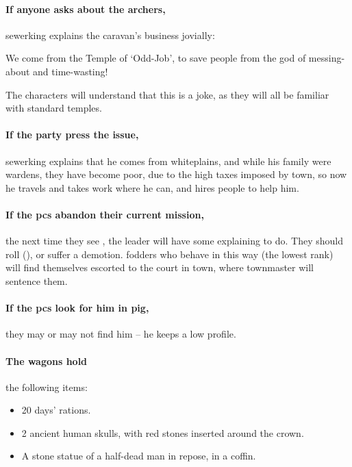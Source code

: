 \setcounter{wounds}{2}
\sewerking


\paragraph{If anyone asks about the archers,}
\gls{sewerking} explains the caravan's business jovially:

\begin{speechtext}
  We come from the Temple of `Odd-Job', to save people from the god of messing-about and time-wasting!
\end{speechtext}

The characters will understand that this is a joke, as they will all be familiar with standard temples.

\paragraph{If the party press the issue,}
\gls{sewerking} explains that he comes from \gls{whiteplains}, and while his family were \glspl{warden}, they have become poor, due to the high taxes imposed by \gls{town}, so now he travels and takes work where he can, and hires people to help him.

\paragraph{If the \glspl{pc} abandon their current mission,}
the next time they see , the leader will have some explaining to do.
They should roll  (\tn[12]), or suffer a demotion.
\Glspl{fodder} who behave in this way (the lowest rank) will find themselves escorted to the \gls{court} in \gls{town}, where \gls{townmaster} will sentence them.

\paragraph{If the \glspl{pc} look for him in \gls{pig},}
they may or may not find him -- he keeps a low profile.

\paragraph{The wagons hold}
the following items:

\begin{itemize}
  \item
  20 days' \glspl{ration}.
  \item
  2 ancient human skulls, with red stones inserted around the crown.
  \label{skullCrown}
  \item
  A stone statue of a half-dead man in repose, in a coffin.
\end{itemize}

